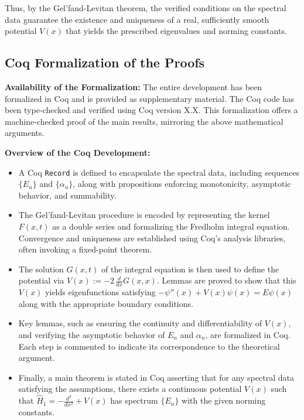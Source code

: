 \documentclass[12pt]{article}
\begin{document}
Thus, by the Gel’fand-Levitan theorem, the verified conditions on the spectral data guarantee the existence and uniqueness of a real, sufficiently smooth potential \(V(x)\) that yields the prescribed eigenvalues and norming constants.

\subsection*{Coq Formalization of the Proofs}

\textbf{Availability of the Formalization:} The entire development has been formalized in Coq and is provided as supplementary material. The Coq code has been type-checked and verified using Coq version X.X. This formalization offers a machine-checked proof of the main results, mirroring the above mathematical arguments.

\textbf{Overview of the Coq Development:}

\begin{itemize}[leftmargin=*, labelsep=5mm]
    \item A Coq \texttt{Record} is defined to encapsulate the spectral data, including sequences \(\{E_n\}\) and \(\{\alpha_n\}\), along with propositions enforcing monotonicity, asymptotic behavior, and summability.
    \item The Gel’fand-Levitan procedure is encoded by representing the kernel \(F(x,t)\) as a double series and formalizing the Fredholm integral equation. Convergence and uniqueness are established using Coq's analysis libraries, often invoking a fixed-point theorem.
    \item The solution \(G(x,t)\) of the integral equation is then used to define the potential via \(V(x) := -2\,\frac{d}{dx}G(x,x)\). Lemmas are proved to show that this \(V(x)\) yields eigenfunctions satisfying \(-\psi''(x) + V(x)\psi(x) = E\psi(x)\) along with the appropriate boundary conditions.
    \item Key lemmas, such as ensuring the continuity and differentiability of \(V(x)\), and verifying the asymptotic behavior of \(E_n\) and \(\alpha_n\), are formalized in Coq. Each step is commented to indicate its correspondence to the theoretical argument.
    \item Finally, a main theorem is stated in Coq asserting that for any spectral data satisfying the assumptions, there exists a continuous potential \(V(x)\) such that \(\hat{H}_1 = -\frac{d^2}{dx^2} + V(x)\) has spectrum \(\{E_n\}\) with the given norming constants.
\end{itemize}
\end{document}
